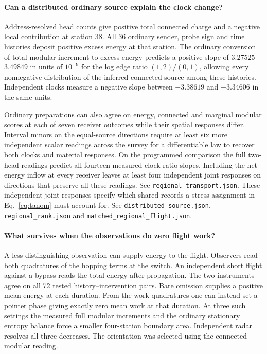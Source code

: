 \documentclass[11pt]{article}
\begin{document}
\paragraph{Can a distributed ordinary source explain the clock change?}
Address-resolved head counts give positive total connected charge and a
negative local contribution at station 38. All 36 ordinary sender, probe
sign and time histories deposit positive excess energy at that station.
The ordinary conversion of total modular increment to excess energy
predicts a positive slope of \(3.27525\)--\(3.49849\) in units of
\(10^{-9}\) for the log edge ratio \((1,2)/(0,1)\), allowing every
nonnegative distribution of the inferred connected source among these
histories. Independent clocks measure a negative slope between
\(-3.38619\) and \(-3.34606\) in the same units.

Ordinary preparations can also agree on energy, connected and marginal
modular scores at each of seven receiver outcomes while their spatial
responses differ. Interval minors on the equal-source directions require
at least six more independent scalar readings across the survey for a
differentiable law to recover both clocks and material responses. On
the programmed comparison the full two-head readings predict all
fourteen measured clock-ratio slopes. Including the net energy inflow
at every receiver leaves at least four independent joint
responses on directions that preserve all these readings. See
\texttt{regional\_transport.json}. These independent joint responses
specify which shared records a stress assignment in Eq.~\eqref{eq:tanom}
must account for. See
\texttt{distributed\_source.json}, \texttt{regional\_rank.json} and
\texttt{matched\_regional\_flight.json}.

\paragraph{What survives when the observations do zero flight work?}
A less distinguishing observation can supply energy to the flight.
Observers read both quadratures of the hopping terms at the switch.
An independent short flight against a bypass reads the total energy
after propagation. The two instruments agree on all 72 tested
history--intervention pairs. Bare omission supplies a positive mean
energy at each duration. From the work quadratures one can instead
set a pointer phase giving exactly zero mean work at that duration.
At three such settings the measured full modular increments and the
ordinary stationary entropy balance force a smaller four-station
boundary area. Independent radar resolves all three decreases.
The orientation was selected using the connected modular reading.
\end{document}
